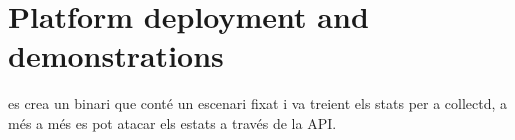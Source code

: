 \chapter{Platform deployment and demonstrations}\label{H:platformDeploymentAndDemonstrations}


es crea un binari que conté un escenari fixat i va treient els stats per a collectd, a  més a més es pot atacar els estats a través de la API.